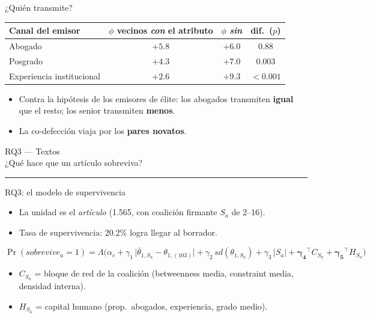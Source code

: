 \documentclass[aspectratio=169,11pt]{beamer}
\newcommand{\emphr}[1]{{\color{ndreddark}\textbf{#1}}}
\newcommand{\sectionslide}[2]{%
  \begin{frame}[plain]
    \vfill
    \begin{center}
      {\footnotesize\color{ndgray} #1}\\[6pt]
      {\Large #2}\\[2pt]
      {\color{ndred}\rule{0.30\textwidth}{1.1pt}}
    \end{center}
    \vfill
  \end{frame}}
\begin{document}
\begin{frame}{¿Quién transmite?}
\begin{center}\small
\begin{tabular}{lccc}
\toprule
Canal del emisor & $\phi$ vecinos \emph{con} el atributo & $\phi$ \emph{sin} & dif.\ ($p$) \\
\midrule
Abogado & $+5.8$ & $+6.0$ & $0.88$ \\
Posgrado & $+4.3$ & $+7.0$ & $0.003$ \\
Experiencia institucional & $+2.6$ & $+9.3$ & $<0.001$ \\
\bottomrule
\end{tabular}
\end{center}
\vspace{0.25cm}
\begin{itemize}
  \item Contra la hipótesis de los emisores de élite: los abogados transmiten \emphr{igual} que el resto; los senior transmiten \emphr{menos}.
  \item La co-defección viaja por los \emphr{pares novatos}.
\end{itemize}
\end{frame}

\sectionslide{RQ3 — Textos}{¿Qué hace que un artículo sobreviva?}

\begin{frame}{RQ3: el modelo de supervivencia}
\begin{itemize}
  \item La unidad es el \emph{artículo} (1.565, con coalición firmante $S_a$ de 2--16). 
  \item Tasa de supervivencia: 20.2\% logra llegar al borrador.
\end{itemize}
\vspace{0.5cm}
$$\Pr(sobrevive_a = 1) = \Lambda\Big(\alpha_c + \gamma_1\, \big|\bar\theta_{1,S_a} - \theta_{1,(103)}\big| + \gamma_2\, sd(\theta_{1,S_a}) + \gamma_3\, |S_a| + \boldsymbol{\gamma_4}^\top C_{S_a} + \boldsymbol{\gamma_5}^\top H_{S_a}\Big)$$
\begin{itemize}
  \item $C_{S_a}$ = bloque de red de la coalición (betweenness media, constraint media, densidad interna).
  \item $H_{S_a}$ = capital humano (prop.\ abogados, experiencia, grado medio).
\end{itemize}
\end{frame}
\end{document}

